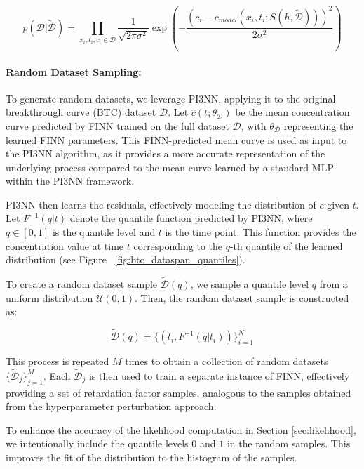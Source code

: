 \begin{equation*}
    p(\mathcal{D} | \tilde{\mathcal{D}}) = \prod_{x_i, t_i, c_i \in \mathcal{D}} \frac{1}{\sqrt{2\pi \sigma^2}} \exp \left( -\frac{(c_i - c_{model}(x_i, t_i; S(h, \tilde{\mathcal{D}})))^2}{2\sigma^2} \right)
\end{equation*}

\paragraph{Random Dataset Sampling:}
\label{sec:random_dataset_sampling}
To generate random datasets, we leverage PI3NN, applying it to the original breakthrough curve (BTC) dataset $\mathcal{D}$. Let $\hat{c}(t; \theta_{\mathcal{D}})$ be the mean concentration curve predicted by FINN trained on the full dataset $\mathcal{D}$, with $\theta_{\mathcal{D}}$ representing the learned FINN parameters. This FINN-predicted mean curve is used as input to the PI3NN algorithm, as it provides a more accurate representation of the underlying process compared to the mean curve learned by a standard MLP within the PI3NN framework.

PI3NN then learns the residuals, effectively modeling the distribution of $c$ given $t$. Let $F^{-1}(q | t)$ denote the quantile function predicted by PI3NN, where $q \in [0, 1]$ is the quantile level and $t$ is the time point. This function provides the concentration value at time $t$ corresponding to the $q$-th quantile of the learned distribution (see Figure ~\vref{fig:btc_dataspan_quantiles}).

To create a random dataset sample $\tilde{\mathcal{D}}(q)$, we sample a quantile level $q$ from a uniform distribution $\mathcal{U}(0, 1)$. Then, the random dataset sample is constructed as:

$$
\tilde{\mathcal{D}}(q) = \{ (t_i, F^{-1}(q | t_i) ) \}_{i=1}^N
$$

This process is repeated $M$ times to obtain a collection of random datasets $\{\tilde{\mathcal{D}}_j\}_{j=1}^M$. Each $\tilde{\mathcal{D}}_j$ is then used to train a separate instance of FINN, effectively providing a set of retardation factor samples, analogous to the samples obtained from the hyperparameter perturbation approach.

To enhance the accuracy of the likelihood computation in Section \vref{sec:likelihood}, we intentionally include the quantile levels $0$ and $1$ in the random samples. This improves the fit of the distribution to the histogram of the samples.

